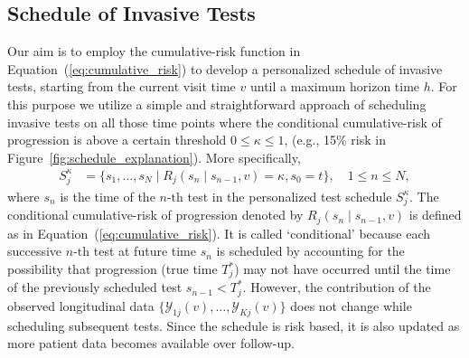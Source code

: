 \subsection{Schedule of Invasive Tests}
Our aim is to employ the cumulative-risk function in Equation~(\ref{eq:cumulative_risk}) to develop a personalized schedule of invasive tests, starting from the current visit time $v$ until a maximum horizon time $h$. For this purpose we utilize a simple and straightforward approach of scheduling invasive tests on all those time points where the conditional cumulative-risk of progression is above a certain threshold $0 \leq \kappa \leq 1$, (e.g., 15\% risk in Figure~\ref{fig:schedule_explanation}). More specifically,
\begin{equation}
\label{eq:personalized_schedule}
\begin{split}
S_j^{\kappa} &= \big\{s_1, \ldots, s_{N} \mid R_j(s_n \mid s_{n-1}, v) = \kappa, s_0 = t \big\}, \quad 1 \leq n \leq N,
\end{split}
\end{equation}
where $s_n$ is the time of the ${n\mbox{-th}}$ test in the personalized test schedule $S_j^{\kappa}$. The conditional cumulative-risk of progression denoted by $R_j(s_n \mid s_{n-1}, v)$ is defined as in Equation~(\ref{eq:cumulative_risk}). It is called `conditional' because each successive ${n\mbox{-th}}$ test at future time $s_{n}$ is scheduled by accounting for the possibility that progression (true time $T^*_j$) may not have occurred until the time of the previously scheduled test $s_{n-1} < T^*_j$. However, the contribution of the observed longitudinal data $\{\mathcal{Y}_{1j}(v), \ldots, \mathcal{Y}_{Kj}(v)\}$ does not change while scheduling subsequent tests. Since the schedule is risk based, it is also updated as more patient data becomes available over follow-up.

